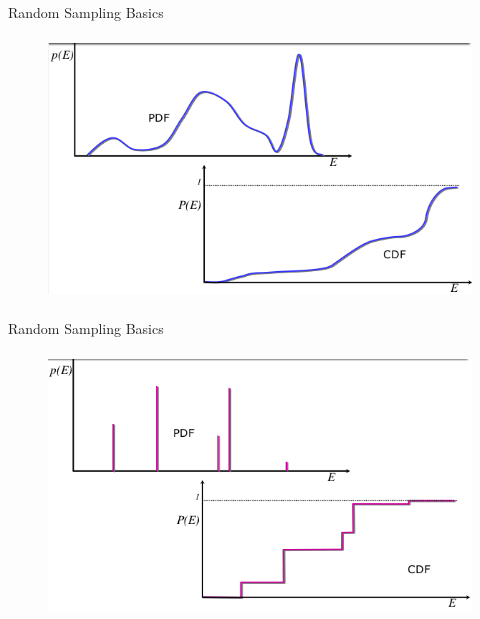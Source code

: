 \documentclass[xcolor=x11names,compress]{beamer}
\renewcommand{\(}{\begin{columns}}
\renewcommand{\)}{\end{columns}}
\newcommand{\<}[1]{\begin{column}{#1}}
\renewcommand{\>}{\end{column}}
\begin{document}
\begin{frame}{Random Sampling Basics}

  	\begin{figure}
  	\begin{center}
  		\includegraphics[height=2.75in,clip]{cont-pdf-cdf-3}
	\end{center}
  	\end{figure}

\end{frame}

\begin{frame}{Random Sampling Basics}

  	\begin{figure}
  	\begin{center}
  		\includegraphics[height=2.75in,clip]{disc-pdf-cdf}
	\end{center}
  	\end{figure}

\end{frame}
\end{document}
